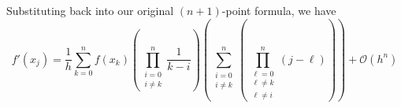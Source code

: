 \documentclass[12pt]{article}
\numberwithin{equation}{section}
\begin{document}
Substituting back into our original \((n+1)\)-point formula, we have
\begin{equation}
	f'(x_j) = \frac{1}{h}\sum_{k=0}^n{f(x_k) \left(\prod_{\substack{
	i=0 \\
	i \neq k}}^n{\frac{1}{k-i}}\right)\left(\sum_{\substack{
	i=0 \\
	i \neq k}}^n{\left(\prod_{\substack{
	\ell =0 \\
	\ell \neq k \\
	\ell \neq i}}^n{(j-\ell)}\right)}\right)}+\mathcal{O}(h^n)
\end{equation}
\end{document}

